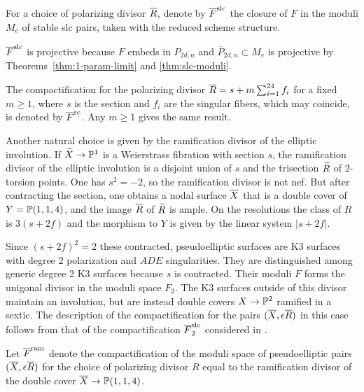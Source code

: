 \documentclass[table,x11names]{amsart}
\begin{document}
\begin{definition}\label{def:oFslc}
  For a choice of polarizing divisor ${\overline R}$, denote by ${\overline F}^{\rm slc}$
  the closure of $F$ in the moduli $M_e$ of stable slc pairs, taken with the
  reduced scheme structure. \end{definition}
  
${\overline F}^{\rm slc}$ is projective because $F$ embeds in $P_{2d,n}$ and
$\overline{P}_{2d,n}\subset M_e$ is projective by Theorems~\ref{thm:1-param-limit}
and \ref{thm:slc-moduli}.

\begin{definition}
  The compactification for the polarizing
  divisor ${\overline R}=s+m\sum_{i=1}^{24} f_i$ for a fixed $m\ge1$,
  where $s$ is the section and $f_i$ are the singular fibers, which
  may coincide, is denoted by ${\overline F}^{{\rm rc}}$.  Any $m\ge1$ gives the same
  result.
\end{definition}

Another natural choice is given by the ramification divisor of the
elliptic involution. If ${\widetilde X}\to{\mathbb P}^1$ is a Weierstrass fibration
with section $s$, the ramification divisor of the elliptic involution
is a disjoint union of $s$ and the trisection ${\widetilde R}$ of $2$-torsion
points. One has $s^2=-2$, so the ramification divisor is not nef.
But after contracting the section, one
obtains a nodal surface ${\overline X}$ that is a double cover of
$Y={\mathbb P}(1,1,4)$, and the image ${\overline R}$ of ${\widetilde R}$ is ample. On the
resolutions the class
of $R$
 is $3(s+2f)$ and the morphism to $Y$ is given by the linear
system $|s+2f|$.

Since $(s+2f)^2=2$ these contracted, pseudoelliptic surfaces
are K3 surfaces with degree 2 polarization and $ADE$ singularities.
They are distinguished among generic degree 2 K3 surfaces
because $s$ is contracted. Their moduli
$F$ forms the unigonal divisor in the 
moduli space $F_2$.
The K3 surfaces outside of this divisor maintain an
involution, but are instead double covers
$X\to {\mathbb P}^2$ ramified in a sextic. The description of the 
compactification for the pairs $({\overline X},\epsilon {\overline R})$ in this case follows
from that of the compactification ${\overline F}_2^{\rm slc}$ considered in
\cite{alexeev2019stable-pair}.

\begin{definition}
  Let ${\overline F}^{{\rm ram}}$ denote the compactification of the moduli space of
  pseudoelliptic pairs $({\overline X},\epsilon {\overline R})$ for the choice of polarizing
  divisor $R$ equal to the ramification divisor of the double cover
  ${\overline X}\to{\mathbb P}(1,1,4)$.
\end{definition}
\end{document}
